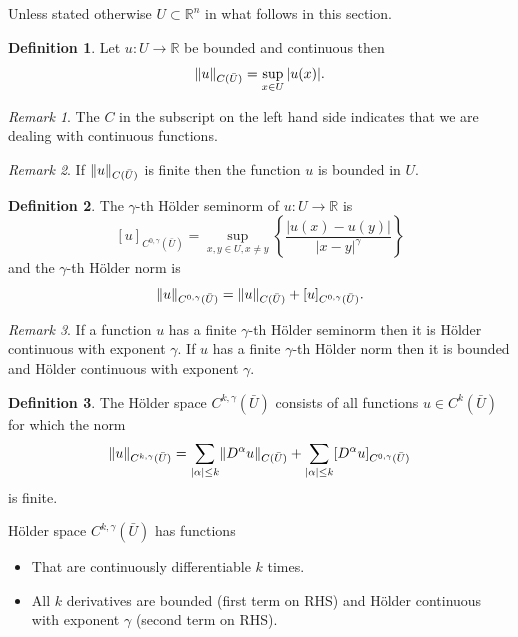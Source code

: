 \documentclass{article}
\DeclarePairedDelimiter\norm{\lVert}{\rVert}
\theoremstyle{plain}
\numberwithin{thm}{section}
\theoremstyle{plain}
\numberwithin{prop}{section}
\theoremstyle{definition}
\newtheorem{defn}{Definition}
\numberwithin{defn}{section}
\theoremstyle{remark}
\newtheorem*{rem}{Remark}
\numberwithin{equation}{section}
\begin{document}
Unless stated otherwise $U \subset \mathbb{R}^n$ in what follows in this section.

\begin{defn}\label{s22e9}
Let $u: U \rightarrow \mathbb{R}$ be bounded and continuous then 
\[
\norm{u}_{C(\bar{U})} = \sup_{x \in U}|u(x)|.
\]
\end{defn}

\begin{rem}
The $C$ in the subscript on the left hand side indicates that we are dealing with continuous functions.
\end{rem}

\begin{rem}
If $\norm{u}_{C(\bar{U})}$ is finite then the function $u$ is bounded in $U$.
\end{rem}

\begin{defn}\label{s22e10}
The $\gamma$-th H\"{o}lder seminorm of $u: U \rightarrow \mathbb{R}$ is
\[
[u]_{C^{0, \gamma}(\bar{U})} = 
\sup_{x, y \in U, x \ne y}\left\{\frac{|u(x) - u(y)|}{|x - y|^\gamma}\right\}
\]
and the $\gamma$-th H\"{o}lder norm is 
\[
\norm{u}_{C^{0, \gamma}(\bar{U})} = \norm{u}_{C(\bar{U})} + [u]_{C^{0, \gamma}(\bar{U})}.
\]
\end{defn}

\begin{rem}
If a function $u$ has a finite $\gamma$-th H\"{o}lder seminorm then it is H\"{o}lder continuous with exponent
$\gamma$. If $u$ has a finite $\gamma$-th H\"{o}lder norm then it is bounded and H\"{o}lder continuous with 
exponent $\gamma$.
\end{rem}

\begin{defn}\label{s22e11}
The H\"{o}lder space $C^{k, \gamma}(\bar{U})$ consists of all functions $u \in C^k(\bar{U})$ for which
the norm 
\[
\norm{u}_{C^{k, \gamma}(\bar{U})} = \sum_{|\alpha| \le k}\norm{D^\alpha u}_{C(\bar{U})} + 
\sum_{|\alpha| \le k}[D^\alpha u]_{C^{0, \gamma}(\bar{U})}
\]
is finite.
\end{defn}

H\"{o}lder space $C^{k, \gamma}(\bar{U})$ has functions 
\begin{itemize}
\item That are continuously differentiable $k$ times.
\item All $k$ derivatives are bounded (first term on RHS) and H\"{o}lder continuous with exponent $\gamma$ (second
term on RHS).
\end{itemize}
\end{document}
